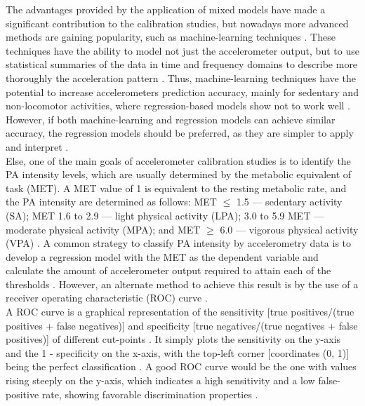 \documentclass[11pt]{article}
\begin{document}
The advantages provided by the application of mixed models have made a significant contribution to the calibration studies, but nowadays more advanced methods are gaining popularity, such as machine-learning techniques \cite{Montoye_2017, Troiano_2014}. These techniques have the ability to model not just the accelerometer output, but to use statistical summaries of the data in time and frequency domains to describe more thoroughly the acceleration pattern \cite{Staudenmayer_2015, Farrahi_2019}. Thus, machine-learning techniques have the potential to increase accelerometers prediction accuracy, mainly for sedentary and non-locomotor activities, where regression-based models show not to work well \cite{Montoye_2017}. However, if both machine-learning and regression models can achieve similar accuracy, the regression models should be preferred, as they are simpler to apply and interpret \cite{Montoye_2017}. \\

Else, one of the main goals of accelerometer calibration studies is to identify the PA intensity levels, which are usually determined by the metabolic equivalent of task (MET). A MET value of 1 is equivalent to the resting metabolic rate, and the PA intensity are determined as follows: MET $\leq$ 1.5 --- sedentary activity (SA); MET 1.6 to 2.9 --- light physical activity (LPA); 3.0 to 5.9 MET --- moderate physical activity (MPA); and MET $\geq$ 6.0 --- vigorous physical activity (VPA) \cite{Piercy_2018}. A common strategy to classify PA intensity by accelerometry data is to develop a regression model with the MET as the dependent variable and calculate the amount of accelerometer output required to attain each of the thresholds \cite{Jago_2007}. However, an alternate method to achieve this result is by the use of a receiver operating characteristic (ROC) curve \cite{Welk_2005, Jago_2007}. \\

A ROC curve is a graphical representation of the sensitivity [true positives/(true positives + false negatives)] and specificity [true negatives/(true negatives + false positives)] of different cut-points \cite{Welk_2005, Jago_2007}. It simply plots the sensitivity on the y-axis and the 1 - specificity on the x-axis, with the top-left corner [coordinates (0, 1)] being the perfect classification \cite{Welk_2005, Jago_2007}. A good ROC curve would be the one with values rising steeply on the y-axis, which indicates a high sensitivity and a low false-positive rate, showing favorable discrimination properties \cite{Welk_2005}. \\
\end{document}
